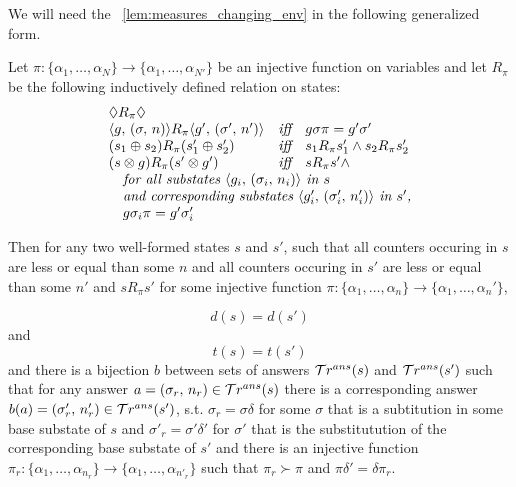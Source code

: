 We will need the \lemmaword~\ref{lem:measures_changing_env} in the following generalized form.

\begin{lemma}
\label{lem:gen_measures_changing_env}
Let $\pi \colon \{ \alpha_1, \dots, \alpha_N \} \to \{ \alpha_1, \dots, \alpha_{N'} \}$ be an injective function on variables and let $R_{\pi}$ be the following inductively defined relation on states:
\[ \begin{array}{lcl}
\Diamond R_{\pi} \Diamond & & \\
\taskst{g}{\mkenv{\sigma}{n}} R_{\pi} \taskst{g'}{\mkenv{\sigma'}{n'}} & \textit{iff} & g \sigma \pi = g' \sigma' \\
(s_1 \oplus s_2) R_{\pi} (s'_1 \oplus s'_2) & \textit{iff} & s_1 R_{\pi} s'_1 \land s_2 R_{\pi} s'_2  \\
(s \otimes g) R_{\pi} (s' \otimes g') & \textit{iff} & s R_{\pi} s' \land \\
\multicolumn{3}{l}{\textit{\quad for all substates $\taskst{g_i}{\mkenv{\sigma_i}{n_i}}$ in $s$}}\\
\multicolumn{3}{l}{\textit{\quad and corresponding substates $\taskst{g'_i}{\mkenv{\sigma'_i}{n'_i}}$ in $s'$,}} \\
\multicolumn{3}{l}{\quad g \sigma_i \pi = g' \sigma'_i} \\
\end{array} \]

Then for any two well-formed states $s$ and $s'$, such that all counters occuring in $s$ are less or equal than some $n$ and all counters occuring in $s'$ are less or equal than some $n'$ and $s R_{\pi} s'$ for some injective function $\pi \colon \{ \alpha_1, \dots, \alpha_n \} \to \{ \alpha_1, \dots, \alpha_n' \}$,

\[ d(s) = d(s') \]
and \[ t(s) = t(s') \]
and there is a bijection $b$ between sets of answers $\mathcal{T}r^{ans}(s)$ and $\mathcal{T}r^{ans}(s')$ such that for any answer $a = (\sigma_r ,\, n_r) \in \mathcal{T}r^{ans}(s)$ there is a corresponding answer $b(a) = (\sigma'_r ,\, n'_r) \in \mathcal{T}r^{ans}(s')$, s.t. $\sigma_r = \sigma \delta$ for some $\sigma$ that is a subtitution in some base substate of $s$ and $\sigma'_r = \sigma' \delta'$ for $\sigma'$ that is the substitutution of the corresponding base substate of $s'$ and there is an injective function $\pi_r \colon \{ \alpha_1, \dots, \alpha_{n_r} \} \to \{ \alpha_1, \dots, \alpha_{n'_r} \}$ such that $\pi_r \succ \pi$ and $\pi \delta' = \delta \pi_r$.
\end{lemma}
